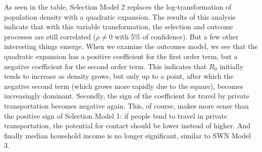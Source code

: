 \documentclass[preprint, 3p,
authoryear]{elsarticle} %
\begin{document}
As seen in the table, Selection Model 2 replaces the log-transformation
of population density with a quadratic expansion. The results of this
analysis indicate that with this variable transformation, the selection
and outcome processes are still correlated (\(\rho\ne0\) with 5\% of
confidence). But a few other interesting things emerge. When we examine
the outcomes model, we see that the quadratic expansion has a positive
coefficient for the first order term, but a negative coefficient for the
second order term. This indicates that \(R_0\) initially tends to
increase as density grows, but only up to a point, after which the
negative second term (which grows more rapidly due to the square),
becomes increasingly dominant. Secondly, the sign of the coefficient for
travel by private transportation becomes negative again. This, of
course, makes more sense than the positive sign of Selection Model 1: if
people tend to travel in private transportation, the potential for
contact should be lower instead of higher. And finally median household
income is no longer significant, similar to SWN Model 3.
\end{document}
